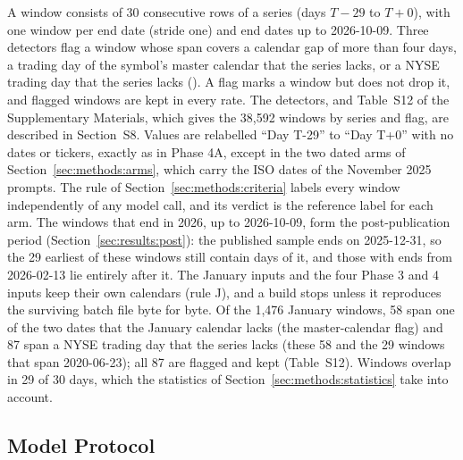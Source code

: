 A window consists of 30 consecutive rows of a series (days $T{-}29$ to $T{+}0$), with one window per end date (stride one) and end dates up to 2026-10-09. Three detectors flag a window whose span covers a calendar gap of more than four days, a trading day of the symbol's master calendar that the series lacks, or a NYSE trading day that the series lacks (). A flag marks a window but does not drop it, and flagged windows are kept in every rate. The detectors, and Table~S12 of the Supplementary Materials, which gives the 38{,}592 windows by series and flag, are described in Section~S8.
Values are relabelled ``Day T-29'' to ``Day T+0'' with no dates or tickers, exactly as in Phase 4A, except in the two dated arms of Section~\ref{sec:methods:arms}, which carry the ISO dates of the November 2025 prompts. The rule of Section~\ref{sec:methods:criteria} labels every window independently of any model call, and its verdict is the reference label for each arm. The windows that end in 2026, up to 2026-10-09, form the post-publication period (Section~\ref{sec:results:post}): the published sample ends on 2025-12-31, so the 29 earliest of these windows still contain days of it, and those with ends from 2026-02-13 lie entirely after it.
The January inputs and the four Phase 3 and 4 inputs keep their own calendars (rule J), and a build stops unless it reproduces the surviving batch file byte for byte. Of the 1{,}476 January windows, 58 span one of the two dates that the January calendar lacks (the master-calendar flag) and 87 span a NYSE trading day that the series lacks (these 58 and the 29 windows that span 2020-06-23); all 87 are flagged and kept (Table~S12). Windows overlap in 29 of 30 days, which the statistics of Section~\ref{sec:methods:statistics} take into account.

\subsection{Model Protocol}
\label{sec:methods:model}

